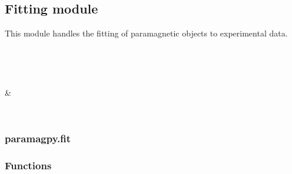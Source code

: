 \documentclass[a4paper,10pt,english,openany,oneside]{sphinxmanual}
\begin{document}
\subsection{Fitting module}
\label{\detokenize{reference/index:fitting-module}}
This module handles the fitting of paramagnetic objects to experimental data.


\begin{savenotes}\sphinxatlongtablestart\begin{longtable}{}
\hline

\endfirsthead

%
{}\\
\hline

\endhead

\hline
{}\\
\endfoot

\endlastfoot

{\hyperref[\detokenize{reference/generated/paramagpy.fit:module-paramagpy.fit}]{}}
&

\\
\hline
\end{longtable}\sphinxatlongtableend\end{savenotes}


\subsubsection{paramagpy.fit}
\label{\detokenize{reference/generated/paramagpy.fit:module-paramagpy.fit}}\label{\detokenize{reference/generated/paramagpy.fit:paramagpy-fit}}\label{\detokenize{reference/generated/paramagpy.fit::doc}}\subsubsection*{Functions}
\end{document}
